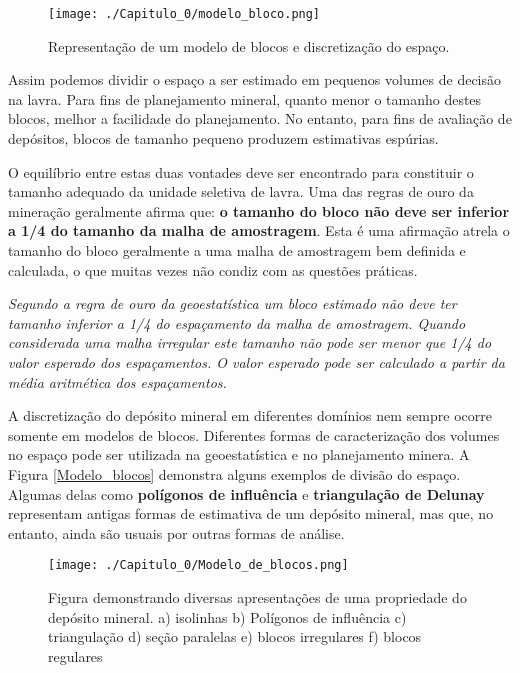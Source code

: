 \FloatBarrier
\begin{figure}[!htb]
	\centering
	\texttt{[image: ./Capitulo\_0/modelo\_bloco.png]}	
	\caption{Representação de um modelo de blocos e discretização do espaço. }
	\label{mod_blok}
\end{figure}
\FloatBarrier

Assim podemos dividir o espaço a ser estimado em pequenos volumes de decisão na lavra. Para fins de planejamento mineral, quanto menor o tamanho destes blocos, melhor a facilidade do planejamento. No entanto, para fins de avaliação de depósitos, blocos de tamanho pequeno produzem estimativas espúrias. 

O equilíbrio entre estas duas vontades deve ser encontrado para constituir o tamanho adequado da unidade seletiva de lavra. Uma das regras de ouro da mineração geralmente afirma que: \textbf{o tamanho do bloco não deve ser inferior a 1/4 do tamanho da malha de amostragem}. Esta é uma afirmação atrela o tamanho do bloco geralmente a uma malha de amostragem bem definida e calculada, o que muitas vezes não condiz com as questões práticas.

\begin{proposition}
	\textit{Segundo a regra de ouro da geoestatística um bloco estimado não deve ter tamanho inferior a 1/4 do espaçamento da malha de amostragem. Quando considerada uma malha irregular este tamanho não pode ser menor que 1/4 do valor esperado dos espaçamentos. O valor esperado pode ser calculado a partir da média aritmética dos espaçamentos.}
\end{proposition}

A discretização do depósito mineral em diferentes domínios nem sempre ocorre somente em modelos de blocos. Diferentes formas de caracterização dos volumes no espaço pode ser utilizada na geoestatística e no planejamento minera. A Figura \eqref{Modelo_blocos} demonstra alguns exemplos de divisão do espaço. Algumas delas como \textbf{polígonos de influência} e \textbf{triangulação de Delunay} representam antigas formas de estimativa de um depósito mineral, mas que, no entanto, ainda são usuais por outras formas de análise. 

\FloatBarrier
\begin{figure}[!htb]
	\centering
	\texttt{[image: ./Capitulo\_0/Modelo\_de\_blocos.png]}	
	\caption{Figura demonstrando diversas apresentações de uma propriedade do depósito mineral. a) isolinhas b) Polígonos de influência c) triangulação d) seção paralelas e) blocos irregulares f) blocos regulares }
	\label{Modelo_blocos}
\end{figure}
\FloatBarrier

